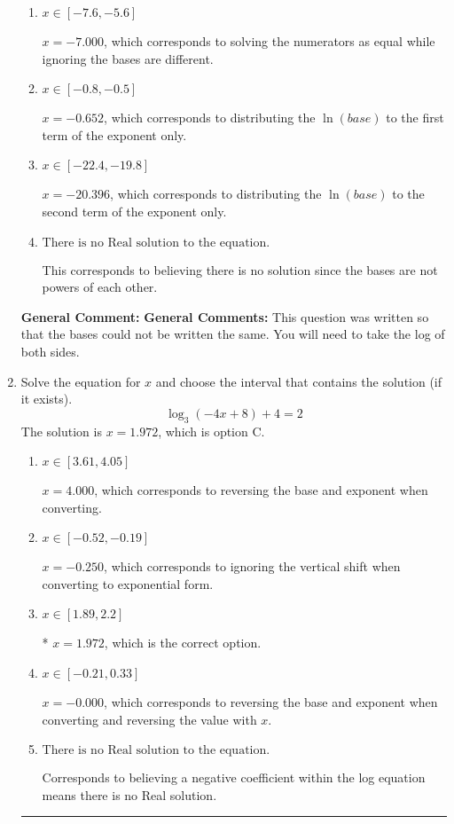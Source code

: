 \documentclass{extbook}[14pt]
\newcommand{\litem}[1]{\item #1

\rule{\textwidth}{0.4pt}}
\begin{document}
\begin{enumerate}
{\begin{enumerate}[label=\Alph*.]
* $x = -1.899$, which is the correct option.
\item \( x \in [-7.6, -5.6] \)

$x = -7.000$, which corresponds to solving the numerators as equal while ignoring the bases are different.
\item \( x \in [-0.8, -0.5] \)

$x = -0.652$, which corresponds to distributing the $\ln(base)$ to the first term of the exponent only.
\item \( x \in [-22.4, -19.8] \)

$x = -20.396$, which corresponds to distributing the $\ln(base)$ to the second term of the exponent only.
\item \( \text{There is no Real solution to the equation.} \)

This corresponds to believing there is no solution since the bases are not powers of each other.
\end{enumerate}

\textbf{General Comment:} \textbf{General Comments:} This question was written so that the bases could not be written the same. You will need to take the log of both sides.
}
\litem{
Solve the equation for $x$ and choose the interval that contains the solution (if it exists).
\[ \log_{3}{(-4x+8)}+4 = 2 \]The solution is \( x = 1.972 \), which is option C.\begin{enumerate}[label=\Alph*.]
\item \( x \in [3.61, 4.05] \)

$x = 4.000$, which corresponds to reversing the base and exponent when converting.
\item \( x \in [-0.52, -0.19] \)

$x = -0.250$, which corresponds to ignoring the vertical shift when converting to exponential form.
\item \( x \in [1.89, 2.2] \)

* $x = 1.972$, which is the correct option.
\item \( x \in [-0.21, 0.33] \)

$x = -0.000$, which corresponds to reversing the base and exponent when converting and reversing the value with $x$.
\item \( \text{There is no Real solution to the equation.} \)

Corresponds to believing a negative coefficient within the log equation means there is no Real solution.
\end{enumerate}

}
\end{enumerate}
\end{document}
